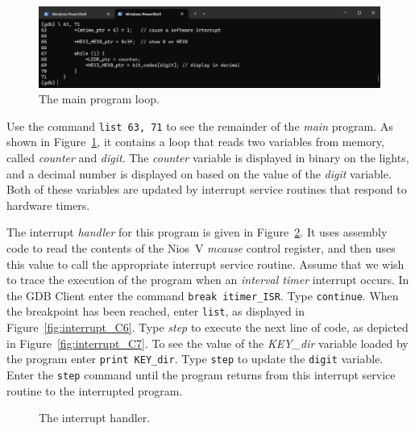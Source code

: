 \documentclass[11pt, twoside, pdftex]{article}
\newcommand{\red}[1]{{\color{red}\sf{#1}}}
\begin{document}
\begin{figure}[h]
    \begin{center}
        \includegraphics[scale=.6]{figures/interrupt_C5.png}
        \caption{The main program loop.}
        \label{fig:interrupt_C5}
    \end{center}
\end{figure}

Use the command \texttt{list 63, 71} to see the remainder of the {\it main} program. As shown in
Figure~\ref{fig:interrupt_C5}, it contains a 
loop that reads two variables from memory, called {\it counter} and {\it digit}.  The
{\it counter} variable is displayed in binary on the \red{{\it LEDR}} lights, and a decimal 
number is displayed on \red{{\it HEX0}} based on the value of the {\it digit} variable.
Both of these variables are updated by interrupt service routines that respond to hardware 
timers.

The interrupt {\it handler} for this program is given in Figure~\ref{fig:interrupt_code}.
It uses assembly code to read the contents of the Nios~V {\it mcause} control register, and then
uses this value to call the appropriate interrupt service routine. Assume that we wish to
trace the execution of the program when an {\it interval timer} interrupt occurs. In the
GDB Client enter the command \texttt{break itimer\_ISR}. Type \texttt{continue}. When the
breakpoint has been reached, enter \texttt{list}, as displayed in
Figure~\ref{fig:interrupt_C6}. Type {\it step} to execute the next line of code, as
depicted in Figure~\ref{fig:interrupt_C7}. To see the value of the {\it KEY\_dir} variable
loaded by the program enter \texttt{print KEY\_dir}. Type \texttt{step} to update the
\texttt{digit} variable. Enter the \texttt{step} command until the program returns from this 
interrupt service routine to the interrupted program.

\begin{figure}[H]

	\caption{The interrupt handler.}
	\label{fig:interrupt_code}
\end{figure}
\end{document}
